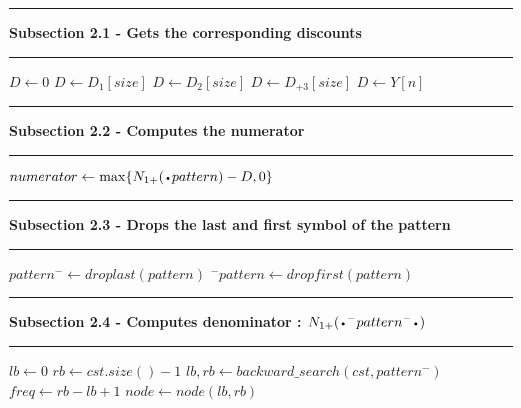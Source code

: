 \documentclass[11pt]{article}
\newcommand\Algphase[1]{%
\vspace*{-.7\baselineskip}\Statex\hspace*{\dimexpr-\algorithmicindent-2pt\relax}\rule{\textwidth}{0.1pt}%
\Statex\hspace*{-\algorithmicindent}\textbf{#1}%
\vspace*{-.7\baselineskip}\Statex\hspace*{\dimexpr-\algorithmicindent-2pt\relax}\rule{\textwidth}{0.1pt}%
}
\newcommand*{\LargerCdot}{\raisebox{-0.75ex}{\scalebox{2}{$\cdot$}}}
\begin{document}
\begin{algorithm*}
\begin{algorithmic}
	\Algphase{ Subsection 2.1 - Gets the corresponding discounts}
	\State $D\gets 0$
			\State $D\gets D_1[size]$
			\State $D\gets D_2[size]$
			\State $D\gets D_{+3}[size]$
		\EndIf
	\Else
		\State $D\gets Y[n]$
	\EndIf
	\Algphase{ Subsection 2.2 - Computes the numerator}
	\State $numerator\gets \max\{N_{1+}(\LargerCdot pattern)-D,0\}$
	
    \Algphase{ Subsection 2.3 - Drops the last and first symbol of the pattern}
    \State $pattern^{-}\gets droplast(pattern)$
	\State $^{-}pattern\gets dropfirst(pattern)$
	
    \Algphase{ Subsection 2.4 - Computes denominator : $N_{1+}(\LargerCdot^{-}pattern^{-}\LargerCdot)$}
    \State $lb\gets 0$
	\State $rb\gets cst.size()-1$
	\State $lb,rb\gets backward\_search(cst,pattern^{-})$
	\State $freq\gets rb-lb+1$
	\State $node \gets node(lb,rb)$
	
\end{algorithmic}
\end{algorithm*}
\end{document}
